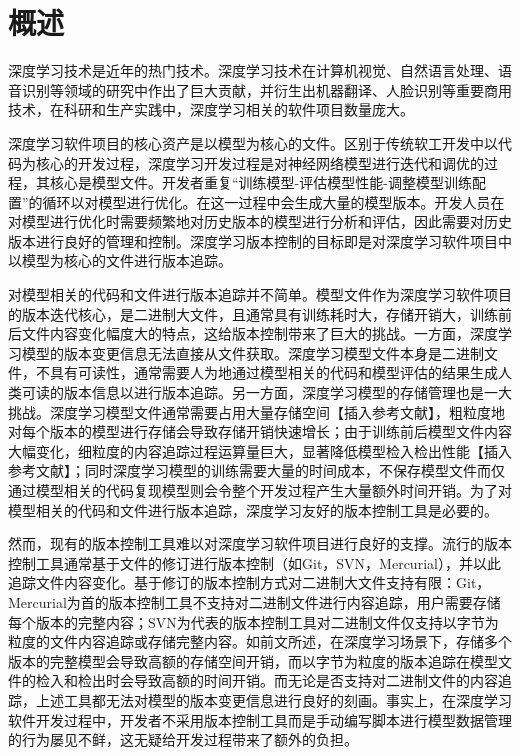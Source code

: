 \documentclass{cjc}
\begin{document}
\maketitle


\section{概述}

深度学习技术是近年的热门技术。深度学习技术在计算机视觉、自然语言处理、语音识别等领域的研究中作出了巨大贡献，并衍生出机器翻译、人脸识别等重要商用技术，在科研和生产实践中，深度学习相关的软件项目数量庞大。

深度学习软件项目的核心资产是以模型为核心的文件。区别于传统软工开发中以代码为核心的开发过程，深度学习开发过程是对神经网络模型进行迭代和调优的过程，其核心是模型文件。开发者重复“训练模型-评估模型性能-调整模型训练配置”的循环以对模型进行优化。在这一过程中会生成大量的模型版本。开发人员在对模型进行优化时需要频繁地对历史版本的模型进行分析和评估，因此需要对历史版本进行良好的管理和控制。深度学习版本控制的目标即是对深度学习软件项目中以模型为核心的文件进行版本追踪。

对模型相关的代码和文件进行版本追踪并不简单。模型文件作为深度学习软件项目的版本迭代核心，是二进制大文件，且通常具有训练耗时大，存储开销大，训练前后文件内容变化幅度大的特点，这给版本控制带来了巨大的挑战。一方面，深度学习模型的版本变更信息无法直接从文件获取。深度学习模型文件本身是二进制文件，不具有可读性，通常需要人为地通过模型相关的代码和模型评估的结果生成人类可读的版本信息以进行版本追踪。另一方面，深度学习模型的存储管理也是一大挑战。深度学习模型文件通常需要占用大量存储空间【插入参考文献】，粗粒度地对每个版本的模型进行存储会导致存储开销快速增长；由于训练前后模型文件内容大幅变化，细粒度的内容追踪过程运算量巨大，显著降低模型检入检出性能【插入参考文献】；同时深度学习模型的训练需要大量的时间成本，不保存模型文件而仅通过模型相关的代码复现模型则会令整个开发过程产生大量额外时间开销。为了对模型相关的代码和文件进行版本追踪，深度学习友好的版本控制工具是必要的。


然而，现有的版本控制工具难以对深度学习软件项目进行良好的支撑。流行的版本控制工具通常基于文件的修订进行版本控制（如Git，SVN，Mercurial），并以此追踪文件内容变化。基于修订的版本控制方式对二进制大文件支持有限：Git，Mercurial为首的版本控制工具不支持对二进制文件进行内容追踪，用户需要存储每个版本的完整内容；SVN为代表的版本控制工具对二进制文件仅支持以字节为粒度的文件内容追踪或存储完整内容。如前文所述，在深度学习场景下，存储多个版本的完整模型会导致高额的存储空间开销，而以字节为粒度的版本追踪在模型文件的检入和检出时会导致高额的时间开销。而无论是否支持对二进制文件的内容追踪，上述工具都无法对模型的版本变更信息进行良好的刻画。事实上，在深度学习软件开发过程中，开发者不采用版本控制工具而是手动编写脚本进行模型数据管理的行为屡见不鲜，这无疑给开发过程带来了额外的负担。
\end{document}
